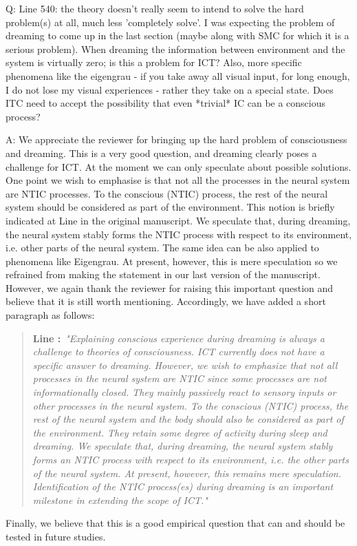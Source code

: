 \documentclass[utf8]{article}
\newcounter{cQuestion}[section]
\newenvironment{question}
    {\refstepcounter{cQuestion}\color{Blue}\noindent\newline Q\thecQuestion:}
    {~\newline}
\newenvironment{ans}  
    {\color{Black}\noindent A:}
    {~\newline}
\newcommand{\addnew}[2]{\blockcquote{}{\textbf{Line #1:}~\newline\textit{"#2"}}
}
\begin{document}
                
        \begin{question}                              
            Line 540: the theory doesn't really seem to intend to solve the hard problem(s) at all, much less 'completely solve'.            
            I was expecting the problem of dreaming to come up in the last section (maybe along with SMC for which it is a serious problem). When dreaming the information between environment and the system is virtually zero; is this a problem for ICT? Also, more specific phenomena like the eigengrau - if you take away all visual input, for long enough, I do not lose my visual experiences - rather they take on a special state. Does ITC need to accept the possibility that even *trivial* IC can be a conscious process?
        \end{question}
    
    	\begin{ans}
    		We appreciate the reviewer for bringing up the hard problem of consciousness and dreaming. This is a very good question, and dreaming clearly poses a challenge for ICT. At the moment we can only speculate about possible solutions. One point we wish to emphasise is that not all the processes in the neural system are NTIC processes. To the conscious (NTIC) process, the rest of the neural system should be considered as part of the environment. This notion is briefly indicated at Line  in the original manuscript. We speculate that, during dreaming, the neural system stably forms the NTIC process with respect to its environment, i.e. other parts of the neural system. The same idea can be also applied to phenomena like Eigengrau. At present, however, this is mere speculation so we refrained from making the statement in our last version of the manuscript. However, we again thank the reviewer for raising this important question and believe that it is still worth mentioning. Accordingly, we have added a short paragraph as follows:
    		    		   
            \addnew{}{Explaining conscious experience during dreaming is always a challenge to theories of consciousness. ICT currently does not have a specific answer to dreaming. However, we wish to emphasize that not all processes in the neural system are NTIC since some processes are not informationally closed. They mainly passively react to sensory inputs or other processes in the neural system. To the conscious (NTIC) process, the rest of the neural system and the body should also be considered as part of the environment. They retain some degree of activity during sleep and dreaming. We speculate that, during dreaming, the neural system stably forms an NTIC process with respect to its environment, i.e. the other parts of the neural system. At present, however, this remains mere speculation. Identification of the NTIC process(es) during dreaming is an important milestone in extending the scope of ICT.}
    		    
    		Finally, we believe that this is a good
    		empirical question that can and should be tested in future studies. 
    	\end{ans}

	
\end{document}
